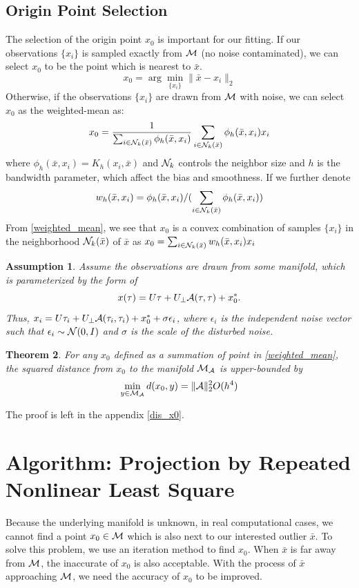 \documentclass[aos,preprint]{imsart}
\newtheorem{theorem}{Theorem}[section]
\newtheorem{assumption}[theorem]{Assumption}
\theoremstyle{remark}
\begin{document}
\subsection{Origin Point Selection} \label{Origin Point Selection}
The selection of the origin point $x_0$ is important for our fitting. If our observations $\{x_i\}$ is sampled exactly from $\cal M$ (no noise contaminated), we can select $x_0$ to be the point which is nearest to $\bar{x}$.
\[
x_0 = \arg\min_{\{x_i\}} \|\bar{x}-x_i\|_2
\]
Otherwise, if the observations $\{x_i\}$ are drawn from $\cal M$ with noise, we can select $x_0$ as the weighted-mean as:
\begin{equation}\label{weighted_mean}
x_0 =\frac{1}{\sum_{i\in {\cal N}_k(\bar{x}) } \phi_h(\bar{x},x_i)} \sum_{i\in {\cal N}_k (\bar{x})} \phi_h(\bar{x},x_i)x_i
\end{equation}
where $\phi_h(\bar{x},x_i) = K_h(x_i, \bar{x})$ and ${\cal N}_k$ controls the neighbor size and $h$ is the bandwidth parameter, which affect the bias and smoothness. If we further denote 
\[
w_h(\bar{x},x_i)=\phi_h( \bar{x},x_i) / (\sum_{i\in {\cal N}_k (\bar{x})} \phi_h(\bar{x},x_i))
\]
From \eqref{weighted_mean}, we see that $x_0$ is a convex combination of samples $\{x_i\}$ in the neighborhood ${\cal N}_k(\bar{x})$ of $\bar{x}$ as $x_0 = \sum_{i\in {\cal N}_k (\bar{x})} w_h(\bar{x},x_i) x_i$
\begin{assumption}
Assume the observations are drawn from some manifold, which is parameterized by the form of
\[
x(\tau) = U \tau+ U_\perp {\cal A}(\tau, \tau)+x_0^*.
\]
Thus, $x_i = U \tau_i + U_\perp {\cal A}(\tau_i,\tau_i)+x_0^* +\sigma \epsilon_i$, where $\epsilon_i$ is the independent noise vector such that $\epsilon_i \sim {\cal N}(0, I)$ and $\sigma$ is the scale of the disturbed noise.
\end{assumption}
\begin{theorem}
For any $x_0$ defined as a summation of point in \eqref{weighted_mean},  the squared distance from $x_0$ to the manifold $\cal M_A$ is upper-bounded by
\[
\min_{y\in {\cal M_A}} d (x_0, y) =  \|{\cal A}\|_2^2O(h^4)
\]
\end{theorem}
The proof is left in the appendix \eqref{dis_x0}.

\section{Algorithm: Projection by Repeated Nonlinear Least Square}\label{nonliear projection}
Because the underlying manifold is unknown, in real computational cases,  we cannot find a point $x_0\in \cal M$ which is also next to our interested outlier $\bar{x}$. To solve this problem, we use an iteration method to find $x_0$. When $\bar{x}$ is far away from $\cal M$, the inaccurate of $x_0$ is also acceptable. With the process of $\bar{x}$ approaching $\cal M$, we need the accuracy of  $x_0$ to be improved.
\end{document}
